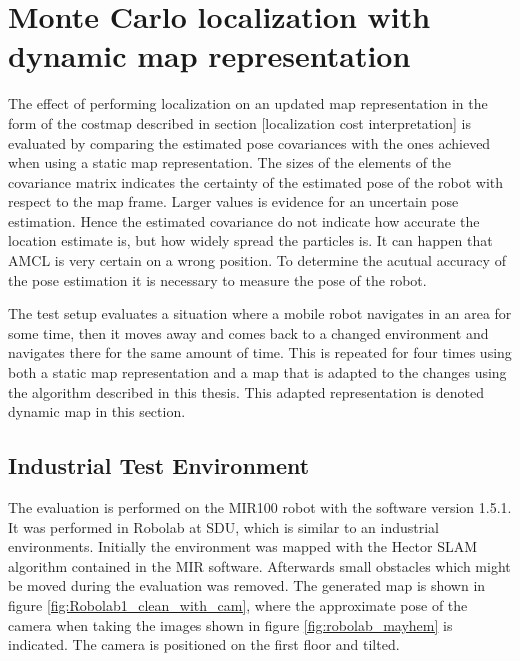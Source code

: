 \section{Monte Carlo localization with dynamic map representation}
\label{sec:amcl_dyn_map}

The effect of performing localization on an updated map representation in the form of the costmap described in section [localization cost interpretation] is evaluated by comparing the estimated pose covariances with the ones achieved when using a static map representation. 
The sizes of the elements of the covariance matrix indicates the certainty of the estimated pose of the robot with respect to the map frame. 
Larger values is evidence for an uncertain pose estimation. Hence the estimated covariance do not indicate how accurate the location estimate is, but how widely spread the particles is. 
It can happen that AMCL is very certain on a wrong position. 
To determine the acutual accuracy of the pose estimation it is necessary to measure the pose of the robot.

The test setup evaluates a situation where a mobile robot navigates in an area for some time, then it moves away and comes back to a changed environment and navigates there for the same amount of time. 
This is repeated for four times using both a static map representation and a map that is adapted to the changes using the algorithm described in this thesis. 
This adapted representation is denoted dynamic map in this section.

\subsection{Industrial Test Environment}
The evaluation is performed on the MIR100 robot with the software version 1.5.1. It was performed in Robolab at SDU, which is similar to an industrial environments. Initially the environment was mapped with the Hector SLAM algorithm contained in the MIR software. 
Afterwards small obstacles which might be moved during the evaluation was removed.
The generated map is shown in figure \ref{fig:Robolab1_clean_with_cam}, where the approximate pose of the camera when taking the images shown in figure \ref{fig:robolab_mayhem} is indicated. 
The camera is positioned on the first floor and tilted.

